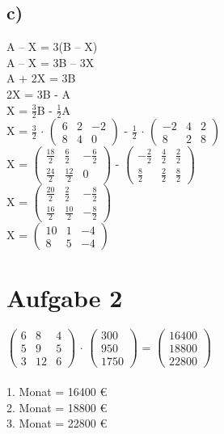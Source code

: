 \documentclass{article}
\begin{document}
	\subsection*{c)}
	A – X = 3(B – X) \\
	A – X = 3B – 3X \\
	A + 2X = 3B \\
	2X = 3B - A \\
	X = $\frac{3}{2}$B - $\frac{1}{2}$A \\
	X = $\frac{3}{2}$ $\cdot$
	$
	\left(\begin{array}{ccc}
	 6& 2 &-2 \\ 8& 4& 0
	\end{array}\right)
	$ 
	- $\frac{1}{2}$ $\cdot$
	$
	\left(\begin{array}{ccc}
	-2 & 4 & 2 \\ 8&2 &8 
	\end{array}\right)
	$  \\
	X =
	$
	\left(\begin{array}{ccc}
	\frac{18}{2}& \frac{6}{2} & -\frac{6}{2} \\ \frac{24}{2}& \frac{12}{2}& 0
	\end{array}\right)
	$ 
	- 
	$
	\left(\begin{array}{ccc}
	-\frac{2}{2} & \frac{4}{2} & \frac{2}{2} \\ \frac{8}{2}&\frac{2}{2} &\frac{8}{2} 
	\end{array}\right)
	$  \\
	X =
	$
	\left(\begin{array}{ccc}
	\frac{20}{2}& \frac{2}{2} & -\frac{8}{2} \\ \frac{16}{2}& \frac{10}{2}& -\frac{8}{2}
	\end{array}\right)
	$ \\
	X =
	$
	\left(\begin{array}{ccc}
	10& 1 & -4 \\ 8& 5& -4
	\end{array}\right)
	$ \\
	\section*{Aufgabe 2}
	$	
	\left(\begin{array}{ccc}
	6 & 8 & 4 \\ 5 & 9 & 5 \\ 3 & 12 & 6	\end{array}\right)$ $\cdot$
	$
	\left(\begin{array}{c}
	300 \\ 950 \\ 1750
	\end{array}\right)
	$ = 
	$
	\left(\begin{array}{c}
	16400 \\ 18800 \\ 22800 
	\end{array}\right)
	$ 
	\\ \\
	1. Monat = 16400 € \\
	2. Monat = 18800 € \\
	3. Monat = 22800 €
	
\end{document}
